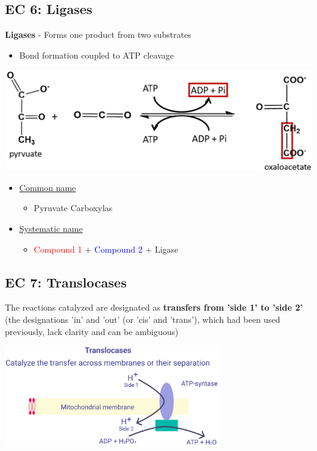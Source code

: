 \documentclass[10pt]{article}
\begin{document}
\subsection*{EC 6: Ligases}
\textbf{Ligases} - Forms one product from two substrates
\begin{itemize}
    \item Bond formation coupled to ATP cleavage
\end{itemize}
\begin{center}
    \includegraphics*[width=\textwidth]{L2_8.png} 
\end{center}
\begin{itemize}
    \item \underline{Common name}
    \begin{itemize}
        \item Pyruvate Carboxylas
    \end{itemize}
    \item \underline{Systematic name}
    \begin{itemize}
        \item \textcolor{red}{Compound 1} + \textcolor{blue}{Compound 2} + Ligase
    \end{itemize}
\end{itemize}

\subsection*{EC 7: Translocases}
The reactions catalyzed are designated as \textbf{transfers from 'side 1' to 'side 2'} (the designations 'in' and 'out' (or 'cis' and 'trans'), which had been used previously, lack clarity and can be ambiguous)
\begin{center}
    \includegraphics*[width=0.7\textwidth]{L2_9.png} 
\end{center}
\end{document}
